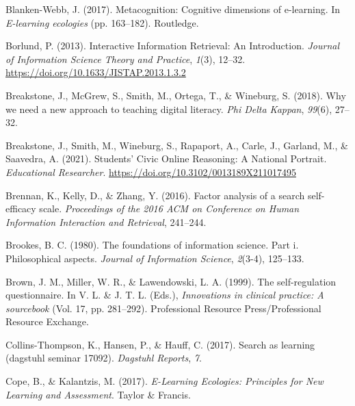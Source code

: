 \documentclass[letterpaper, nobind]{templates/ociamthesis}
\newlength{\cslhangindent}
\newenvironment{CSLReferences}[2] %
 {%
  \setlength{\parindent}{0pt}
  \ifodd #1
  \let\oldpar\par
  \def\par{\hangindent=\cslhangindent\oldpar}
  \fi
  \setlength{\parskip}{1mm}
  \setlength{\baselineskip}{6mm}
 }%
 {}
\begin{document}
\begin{CSLReferences}{1}{0}
\leavevmode{}%
Blanken-Webb, J. (2017). Metacognition: Cognitive dimensions of e-learning. In \emph{E-learning ecologies} (pp. 163--182). Routledge.

\leavevmode{}%
Borlund, P. (2013). Interactive {Information Retrieval}: {An Introduction}. \emph{Journal of Information Science Theory and Practice}, \emph{1}(3), 12--32. \url{https://doi.org/10.1633/JISTAP.2013.1.3.2}

\leavevmode{}%
Breakstone, J., McGrew, S., Smith, M., Ortega, T., \& Wineburg, S. (2018). Why we need a new approach to teaching digital literacy. \emph{Phi Delta Kappan}, \emph{99}(6), 27--32.

\leavevmode{}%
Breakstone, J., Smith, M., Wineburg, S., Rapaport, A., Carle, J., Garland, M., \& Saavedra, A. (2021). Students' {Civic Online Reasoning}: A {National Portrait}. \emph{Educational Researcher}. \url{https://doi.org/10.3102/0013189X211017495}

\leavevmode{}%
Brennan, K., Kelly, D., \& Zhang, Y. (2016). Factor analysis of a search self-efficacy scale. \emph{Proceedings of the 2016 ACM on Conference on Human Information Interaction and Retrieval}, 241--244.

\leavevmode{}%
Brookes, B. C. (1980). The foundations of information science. Part i. Philosophical aspects. \emph{Journal of Information Science}, \emph{2}(3-4), 125--133.

\leavevmode{}%
Brown, J. M., Miller, W. R., \& Lawendowski, L. A. (1999). The self-regulation questionnaire. In V. L. \& J. T. L. (Eds.), \emph{Innovations in clinical practice: A sourcebook} (Vol. 17, pp. 281--292). Professional Resource Press/Professional Resource Exchange.

\leavevmode{}%
Collins-Thompson, K., Hansen, P., \& Hauff, C. (2017). Search as learning (dagstuhl seminar 17092). \emph{Dagstuhl Reports}, \emph{7}.

\leavevmode{}%
Cope, B., \& Kalantzis, M. (2017). \emph{E-{Learning Ecologies}: Principles for {New Learning} and {Assessment}}. {Taylor \& Francis}.


\end{CSLReferences}
\end{document}
